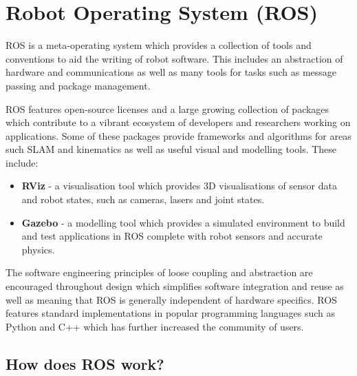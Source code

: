 \documentclass{mproj}
\begin{document}
\section{Robot Operating System (ROS)}

ROS is a meta-operating system which provides a collection of tools and conventions to aid the writing of robot software. This includes an abstraction of hardware and communications as well as many tools for tasks such as message passing and package management.

ROS features open-source licenses and a large growing collection of packages which contribute to a vibrant ecosystem of developers and researchers working on applications. Some of these packages provide frameworks and algorithms for areas such SLAM and kinematics as well as useful visual and modelling tools. These include:

\begin{itemize}
  \item \textbf{RViz} - a visualisation tool which provides 3D visualisations of sensor data and robot states, such as cameras, lasers and joint states.
 \item \textbf{Gazebo} - a modelling tool which provides a simulated environment to build and test applications in ROS complete with robot sensors and accurate physics.
\end{itemize}


The software engineering principles of loose coupling and abstraction are encouraged throughout design which simplifies software integration and reuse as well as meaning that ROS is generally independent of hardware specifics. ROS features standard implementations in popular programming languages such as Python and C++ which has further increased the community of users.

\subsection{How does ROS work?}
\end{document}
